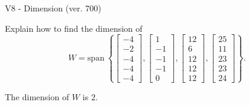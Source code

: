 \begin{exercise}
  \begin{exerciseTitle}V8 - Dimension (ver. 700)\end{exerciseTitle}
  \begin{exerciseStatement}
    Explain how to find the dimension of 
\[W=\mathrm{span}\ \left\{\left[\begin{array}{r}
-4 \\
-2 \\
-4 \\
-4 \\
-4
\end{array}\right] , \left[\begin{array}{r}
1 \\
-1 \\
-1 \\
-1 \\
0
\end{array}\right] , \left[\begin{array}{r}
12 \\
6 \\
12 \\
12 \\
12
\end{array}\right] , \left[\begin{array}{r}
25 \\
11 \\
23 \\
23 \\
24
\end{array}\right]\right\}.\]



  \end{exerciseStatement}
  \begin{exerciseAnswer}
   The dimension of \(W\) is  \(2\).
  


  \end{exerciseAnswer}
\end{exercise}